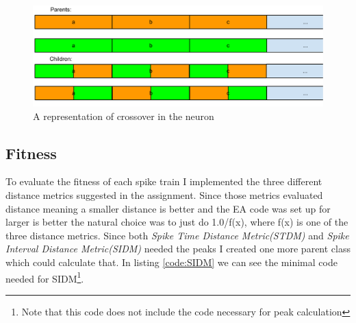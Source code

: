 \begin{figure}[h]
	\centering
	\includegraphics[scale=0.5]{crossover.pdf}
	\caption{A representation of crossover in the neuron}
	\label{fig:neuron-crossover}
\end{figure}

\subsection{Fitness}\label{sec:fitness-description}
To evaluate the fitness of each spike train I implemented the three different
distance metrics suggested in the assignment. Since those metrics evaluated
distance meaning a smaller distance is better and the EA code was set up for
larger is better the natural choice was to just do 1.0/f(x), where f(x) is one of
the three distance metrics. Since both \textit{Spike Time Distance Metric(STDM)}
and \textit{Spike Interval Distance Metric(SIDM)} needed the peaks I created one
more parent class which could calculate that. In listing \ref{code:SIDM} we can
see the minimal code needed for SIDM\footnote{Note that this code does not
include the code necessary for peak calculation}.


